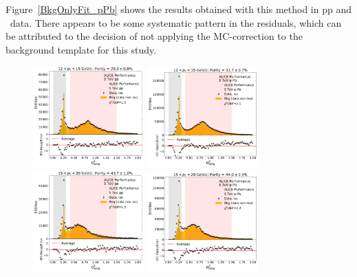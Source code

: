 Figure~\ref{BkgOnlyFit_pPb} shows the results obtained with this method in pp and \pPb~data. There appears to be some systematic pattern in the residuals, which can be attributed to the decision of not applying the MC-correction to the background template for this study. 

\begin{figure}[htpb]
\center
\includegraphics[width=0.38\textwidth]{Data_Analysis/Purity/bf-example-pp-cluster_Lambda-12-15.pdf}
\includegraphics[width=0.38\textwidth]{Data_Analysis/Purity/bf-example-p-Pb-cluster_Lambda-12-15.pdf}
\\
\includegraphics[width=0.38\textwidth]{Data_Analysis/Purity/bf-example-pp-cluster_Lambda-15-20.pdf}
\includegraphics[width=0.38\textwidth]{Data_Analysis/Purity/bf-example-p-Pb-cluster_Lambda-15-20.pdf}

\end{figure}
